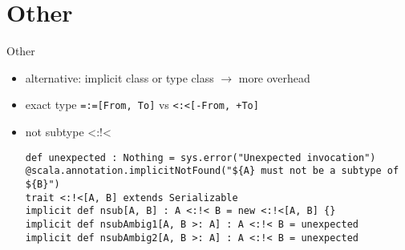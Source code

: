 \documentclass[11pt]{beamer}
\begin{document}
\section{Other} 
\begin{frame}[fragile] {Other}
\begin{itemize}
\item alternative: implicit class or type class $\rightarrow$ more overhead
\item exact type \lstinline{=:=[From, To]} vs \lstinline{<:<[-From, +To]} \pause
\item not subtype \textless:!\textless
\begin{lstlisting} 
def unexpected : Nothing = sys.error("Unexpected invocation")
@scala.annotation.implicitNotFound("${A} must not be a subtype of ${B}")
trait <:!<[A, B] extends Serializable
implicit def nsub[A, B] : A <:!< B = new <:!<[A, B] {}
implicit def nsubAmbig1[A, B >: A] : A <:!< B = unexpected
implicit def nsubAmbig2[A, B >: A] : A <:!< B = unexpected
\end{lstlisting} 
\end{itemize}
\end{frame}
\end{document}
